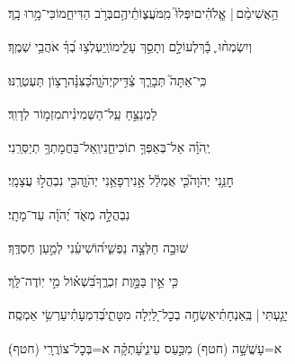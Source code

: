 \documentclass[12pt]{article}
\newcommand{\loc}[1]{\textsuperscript{\locf{#1}}}
\begin{document}
{\loc{ יא}~}‏הַ֥אֲשִׁימֵ֨ם |  אֱֽלֹהִ֗ים{\hfill}יִפְּלוּ֮ מִֽמֹּעֲצ֢וֹתֵ֫יהֶ֥ם\newline\hspace*{.5em}בְּרֹ֣ב  הַדִּיחֵ֑מוֹ{\hfill}כִּי־מָ֥רוּ בָֽךְ׃\par

{\loc{ יב}~}‏וְיִשְׂמְח֨וּ ֪ בָ֡ךְ{\hfill}לְעוֹלָ֣ם \newline\hspace*{.5em}וְתָסֵ֣ךְ עָלֵ֑ימוֹ{\hfill}וְֽיַעְלְצ֥וּ בְ֝ךָ֗ אֹהֲבֵ֥י שְׁמֶֽךָ׃\par

{\loc{ יג}~}‏כִּֽי־אַתָּה֮ תְּבָרֵ֢ךְ צַ֫דִּ֥יק{\hfill}יְהֹוָ֑ה\newline\hspace*{.5em}כַּ֝צִּנָּ֗ה{\hfill}רָצ֥וֹן תַּעְטְרֶֽנּוּ׃\par\pend
\ledpb
\pstart[\subsection*{\textcolor{red}{פרק ו}}]\label{פרק ו}
{\loc{ א}~}‏לַמְנַצֵּ֣חַ  עַֽל־הַשְּׁמִינִ֗ית{\hfill}מִזְמ֥וֹר לְדָוִֽד׃\par

{\loc{ ב}~}‏יְֽהֹוָ֗ה אַל־בְּאַפְּךָ֥ תוֹכִיחֵ֑נִי{\hfill}וְֽאַל־בַּחֲמָתְךָ֥ תְיַסְּרֵֽנִי׃\par

{\loc{ ג}~}‏חׇנֵּ֥נִי יְהֹוָה֮{\hfill}כִּ֤י אֻמְלַ֫ל אָ֥נִי\newline\hspace*{.5em}רְפָאֵ֥נִי יְהֹוָ֑ה{\hfill}כִּ֖י נִבְהֲל֣וּ עֲצָמָֽי׃\par

{\loc{ ד}~}‏ נִבְהֲלָ֣ה מְאֹ֑ד{\hfill} יְ֝הֹוָ֗ה עַד־מָתָֽי׃\par

{\loc{ ה}~}‏שׁוּבָ֣ה  חַלְּצָ֣ה נַפְשִׁ֑י{\hfill}ה֝וֹשִׁיעֵ֗נִי לְמַ֣עַן חַסְדֶּֽךָ׃\par

{\loc{ ו}~}‏כִּ֤י אֵ֣ין בַּמָּ֣וֶת זִכְרֶ֑ךָ{\hfill}בִּ֝שְׁא֗וֹל מִ֣י יֽוֹדֶה־לָּֽךְ׃\par

{\loc{ ז}~}‏יָגַ֤עְתִּי |  בְּֽאַנְחָתִ֗י{\hfill}אַשְׂחֶ֣ה בְכׇל־לַ֭יְלָה מִטָּתִ֑י\newline\hspace*{.5em}בְּ֝דִמְעָתִ֗י{\hfill}עַרְשִׂ֥י אַמְסֶֽה׃\par

{\loc{ ח}~}‏א=עָשֲׁשָׁ֣ה (חטף) מִכַּ֣עַס עֵינִ֑י{\hfill}עָ֝תְקָ֗ה א=בְּכׇל־צוֹרֲרָֽי (חטף)׃\par
\end{document}
